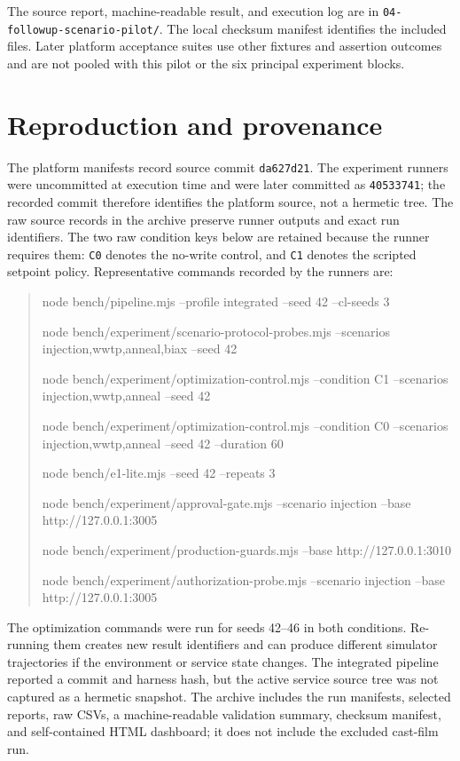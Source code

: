 \documentclass[10pt]{article}
\begin{document}
The source report, machine-readable result, and execution log are in
\texttt{04-followup-scenario-pilot/}. The local checksum manifest identifies
the included files. Later platform acceptance suites use other fixtures and
assertion outcomes and are not pooled with this pilot or the six principal
experiment blocks.

\section*{Reproduction and provenance}
The platform manifests record source commit \texttt{da627d21}. The experiment runners were uncommitted at execution time and were later committed as \texttt{40533741}; the recorded commit therefore identifies the platform source, not a hermetic tree. The raw source records in the archive preserve runner outputs and exact run identifiers. The two raw condition keys below are retained because the runner requires them: \texttt{C0} denotes the no-write control, and \texttt{C1} denotes the scripted setpoint policy. Representative commands recorded by the runners are:
\begin{quote}
\footnotesize\ttfamily\raggedright
node bench/pipeline.mjs --profile integrated --seed 42 --cl-seeds 3\par\smallskip
node bench/experiment/scenario-protocol-probes.mjs --scenarios injection,wwtp,anneal,biax --seed 42\par\smallskip
node bench/experiment/optimization-control.mjs --condition C1 --scenarios injection,wwtp,anneal --seed 42\par\smallskip
node bench/experiment/optimization-control.mjs --condition C0 --scenarios injection,wwtp,anneal --seed 42 --duration 60\par\smallskip
node bench/e1-lite.mjs --seed 42 --repeats 3\par\smallskip
node bench/experiment/approval-gate.mjs --scenario injection --base http://127.0.0.1:3005\par\smallskip
node bench/experiment/production-guards.mjs --base http://127.0.0.1:3010\par\smallskip
node bench/experiment/authorization-probe.mjs --scenario injection --base http://127.0.0.1:3005
\end{quote}
The optimization commands were run for seeds 42--46 in both conditions. Re-running them creates new result identifiers and can produce different simulator trajectories if the environment or service state changes. The integrated pipeline reported a commit and harness hash, but the active service source tree was not captured as a hermetic snapshot. The archive includes the run manifests, selected reports, raw CSVs, a machine-readable validation summary, checksum manifest, and self-contained HTML dashboard; it does not include the excluded cast-film run.



\end{document}
